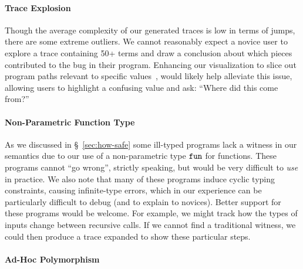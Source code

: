 \paragraph{Trace Explosion}
Though the average complexity of our generated traces is low in terms of
jumps, there are some extreme outliers.
%
We cannot reasonably expect a novice user to explore a trace containing
50+ terms and draw a conclusion about which pieces contributed to the
bug in their program.
%
Enhancing our visualization to slice out program paths relevant to
specific values~\cite{Perera2012-dy}, would likely help alleviate this
issue, allowing users to highlight a confusing value and ask: ``Where
did this come from?''

\paragraph{Non-Parametric Function Type}
As we discussed in \S~\ref{sec:how-safe} some ill-typed programs
lack a witness in our semantics due to our use of a non-parametric
type $\mathtt{fun}$ for functions.
%
These programs cannot ``go wrong'', strictly speaking, but would be very
difficult to \emph{use} in practice.
%
We also note that many of these programs induce cyclic typing constraints,
causing infinite-type errors, which in our experience can be particularly
difficult to debug (and to explain to novices).
%
Better support for these programs would be welcome.
%
For example, we might track how the types of inputs change between
recursive calls.
%
If we cannot find a traditional witness, we could then produce a trace
expanded to show these particular steps.

\paragraph{Ad-Hoc Polymorphism}

